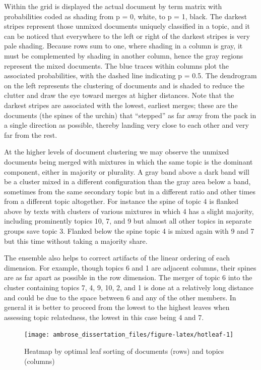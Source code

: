 \documentclass[]{book}
\theoremstyle{definition}
\theoremstyle{definition}
\theoremstyle{definition}
\theoremstyle{remark}
\begin{document}
Within the grid is displayed the actual document by term matrix with
probabilities coded as shading from p = 0, white, to p = 1, black. The
darkest stripes represent those unmixed documents uniquely classified in
a topic, and it can be noticed that everywhere to the left or right of
the darkest stripes is very pale shading. Because rows sum to one, where
shading in a column is gray, it must be complemented by shading in
another column, hence the gray regions represent the mixed documents.
The blue traces within columns plot the associated probabilities, with
the dashed line indicating p = 0.5. The dendrogram on the left
represents the clustering of documents and is shaded to reduce the
clutter and draw the eye toward merges at higher distances. Note that
the darkest stripes are associated with the lowest, earliest merges;
these are the documents (the spines of the urchin) that ``stepped'' as
far away from the pack in a single direction as possible, thereby
landing very close to each other and very far from the rest.

At the higher levels of document clustering we may observe the unmixed
documents being merged with mixtures in which the same topic is the
dominant component, either in majority or plurality. A gray band above a
dark band will be a cluster mixed in a different configuration than the
gray area below a band, sometimes from the same secondary topic but in a
different ratio and other times from a different topic altogether. For
instance the spine of topic 4 is flanked above by texts with clusters of
various mixtures in which 4 has a slight majority, including prominently
topics 10, 7, and 9 but almost all other topics in separate groups save
topic 3. Flanked below the spine topic 4 is mixed again with 9 and 7 but
this time without taking a majority share.

The ensemble also helps to correct artifacts of the linear ordering of
each dimension. For example, though topics 6 and 1 are adjacent columns,
their spines are as far apart as possible in the row dimension. The
merger of topic 6 into the cluster containing topics 7, 4, 9, 10, 2, and
1 is done at a relatively long distance and could be due to the space
between 6 and any of the other members. In general it is better to
proceed from the lowest to the highest leaves when assessing topic
relatedness, the lowest in this case being 4 and 7.

\begin{figure}

{\centering \texttt{[image: ambrose\_dissertation\_files/figure-latex/hotleaf-1]} 

}

\caption{Heatmap by optimal leaf sorting of documents (rows) and topics (columns)}\label{fig:hotleaf}
\end{figure}
\end{document}
